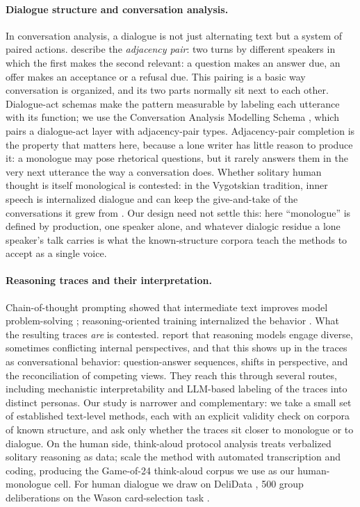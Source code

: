 \documentclass[11pt]{article}
\begin{document}
\paragraph{Dialogue structure and conversation analysis.}
In conversation analysis, a dialogue is not just alternating text but a system
of paired actions. \citet{schegloff1973opening} describe the \emph{adjacency
pair}: two turns by different speakers in which the first makes the second
relevant: a question makes an answer due, an offer makes an acceptance or a
refusal due. This pairing is a basic way conversation is organized, and its
two parts normally sit next to each other. Dialogue-act schemas make the
pattern measurable by labeling each utterance with its function; we use the
Conversation Analysis Modelling Schema \citep[CAMS;][]{duran2022cams}, which
pairs a dialogue-act layer with adjacency-pair types. Adjacency-pair
completion is the property that matters here, because a lone writer has little
reason to produce it: a monologue may pose rhetorical questions, but it rarely
answers them in the very next utterance the way a conversation does. Whether
solitary human thought is itself monological is contested: in the Vygotskian
tradition, inner speech is internalized dialogue and can keep the give-and-take
of the conversations it grew from \citep{fernyhough2004, aldersonday2015}. Our
design need not settle this: here ``monologue'' is defined by production, one
speaker alone, and whatever dialogic residue a lone speaker's talk carries is
what the known-structure corpora teach the methods to accept as a single
voice.

\paragraph{Reasoning traces and their interpretation.}
Chain-of-thought prompting showed that intermediate text improves model
problem-solving \citep{wei2022cot}; reasoning-oriented training internalized
the behavior \citep{deepseek2025r1}. What the resulting traces \emph{are} is
contested. \citet{kim2026societies} report that reasoning models engage
diverse, sometimes conflicting internal perspectives, and that this shows up
in the traces as conversational behavior: question-answer sequences, shifts
in perspective, and the reconciliation of competing views. They reach this
through several routes, including mechanistic interpretability and LLM-based
labeling of the traces into distinct personas. Our study is narrower and
complementary: we take a small set of established text-level methods, each
with an explicit validity check on corpora of known structure, and ask only
whether the traces sit closer to monologue or to dialogue. On the human side,
think-aloud protocol analysis \citep{ericsson1984protocol} treats verbalized
solitary reasoning as data; \citet{wurgaft2025thinkaloud} scale the method
with automated transcription and coding, producing the Game-of-24 think-aloud
corpus we use as our human-monologue cell. For human dialogue we draw on
DeliData \citep{karadzhov2023delidata}, 500 group deliberations on the Wason
card-selection task \citep{wason1968reasoning}.
\end{document}
